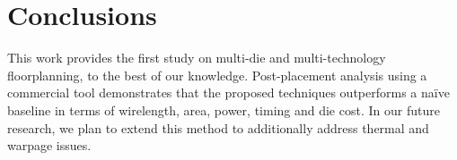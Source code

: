 \section{Conclusions}
\label{sec:conclusions}

This work provides the first study on multi-die and multi-technology floorplanning, to the best of our knowledge. Post-placement analysis using a commercial tool demonstrates that the proposed techniques outperforms a na\"ive baseline in terms of wirelength, area, power, timing and die cost.
In our future research, we plan to extend this method to additionally address thermal and warpage issues.